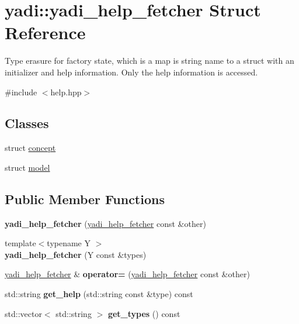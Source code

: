 \hypertarget{structyadi_1_1yadi__help__fetcher}{}\section{yadi\+:\+:yadi\+\_\+help\+\_\+fetcher Struct Reference}
\label{structyadi_1_1yadi__help__fetcher}


Type erasure for factory state, which is a map is string name to a struct with an initializer and help information. Only the help information is accessed.  




{\ttfamily \#include $<$help.\+hpp$>$}

\subsection*{Classes}
\begin{DoxyCompactItemize}
\item 
struct \hyperlink{structyadi_1_1yadi__help__fetcher_1_1concept}{concept}
\item 
struct \hyperlink{structyadi_1_1yadi__help__fetcher_1_1model}{model}
\end{DoxyCompactItemize}
\subsection*{Public Member Functions}
\begin{DoxyCompactItemize}
\item 
\mbox{\label{structyadi_1_1yadi__help__fetcher_a0ac5d533a3d64ebbc8a323d82c6c81e9}} 
{\bfseries yadi\+\_\+help\+\_\+fetcher} (\hyperlink{structyadi_1_1yadi__help__fetcher}{yadi\+\_\+help\+\_\+fetcher} const \&other)
\item 
\mbox{\label{structyadi_1_1yadi__help__fetcher_af9365b5dafe70409a3600b8c020ff8c4}} 
{\footnotesize template$<$typename Y $>$ }\\{\bfseries yadi\+\_\+help\+\_\+fetcher} (Y const \&types)
\item 
\mbox{\label{structyadi_1_1yadi__help__fetcher_ae14eeeac1e6bc8331716bc04ec8f749f}} 
\hyperlink{structyadi_1_1yadi__help__fetcher}{yadi\+\_\+help\+\_\+fetcher} \& {\bfseries operator=} (\hyperlink{structyadi_1_1yadi__help__fetcher}{yadi\+\_\+help\+\_\+fetcher} const \&other)
\item 
\mbox{\label{structyadi_1_1yadi__help__fetcher_ae5619cd8452d605167e680f6af5265b8}} 
std\+::string {\bfseries get\+\_\+help} (std\+::string const \&type) const
\item 
\mbox{\label{structyadi_1_1yadi__help__fetcher_acc545e6b22321f27b0801a7af501b3e3}} 
std\+::vector$<$ std\+::string $>$ {\bfseries get\+\_\+types} () const
\end{DoxyCompactItemize}


